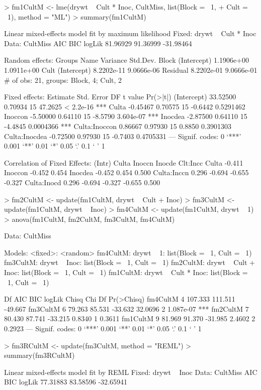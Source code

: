 \documentclass[12pt]{article}
\begin{document}
\begin{Schunk}
\begin{Sinput}
> fm1CultM <- lme(drywt ~ Cult * Inoc, CultMiss, list(Block = ~1, 
+     Cult = ~1), method = "ML")
> summary(fm1CultM)
\end{Sinput}
\begin{Soutput}
Linear mixed-effects model fit by maximum likelihood
Fixed: drywt ~ Cult * Inoc 
 Data: CultMiss 
      AIC      BIC    logLik
 81.96929 91.36999 -31.98464

Random effects:
 Groups   Name        Variance   Std.Dev.  
 Block    (Intercept) 1.1906e+00 1.0911e+00
 Cult     (Intercept) 8.2202e-11 9.0666e-06
 Residual             8.2202e-01 9.0666e-01
# of obs: 21, groups: Block, 4; Cult, 2

Fixed effects:
              Estimate Std. Error DF t value  Pr(>|t|)    
(Intercept)   33.52500    0.70934 15 47.2625 < 2.2e-16 ***
Culta         -0.45467    0.70575 15 -0.6442 0.5291462    
Inoccon       -5.50000    0.64110 15 -8.5790 3.604e-07 ***
Inocdea       -2.87500    0.64110 15 -4.4845 0.0004366 ***
Culta:Inoccon  0.86667    0.97930 15  0.8850 0.3901303    
Culta:Inocdea -0.72500    0.97930 15 -0.7403 0.4705331    
---
Signif. codes:  0 `***' 0.001 `**' 0.01 `*' 0.05 `.' 0.1 ` ' 1 

Correlation of Fixed Effects:
            (Intr) Culta  Inoccn Inocde Clt:Incc
Culta       -0.411                              
Inoccon     -0.452  0.454                       
Inocdea     -0.452  0.454  0.500                
Culta:Inccn  0.296 -0.694 -0.655 -0.327         
Culta:Inocd  0.296 -0.694 -0.327 -0.655  0.500  
\end{Soutput}
\begin{Sinput}
> fm2CultM <- update(fm1CultM, drywt ~ Cult + Inoc)
> fm3CultM <- update(fm1CultM, drywt ~ Inoc)
> fm4CultM <- update(fm1CultM, drywt ~ 1)
> anova(fm1CultM, fm2CultM, fm3CultM, fm4CultM)
\end{Sinput}
\begin{Soutput}
Data: CultMiss

Models: <fixed>: <random>
fm4CultM: drywt ~ 1: list(Block = ~1, Cult = ~1)
fm3CultM: drywt ~ Inoc: list(Block = ~1, Cult = ~1)
fm2CultM: drywt ~ Cult + Inoc: list(Block = ~1, Cult = ~1)
fm1CultM: drywt ~ Cult * Inoc: list(Block = ~1, Cult = ~1)

         Df     AIC     BIC  logLik   Chisq Chi Df Pr(>Chisq)    
fm4CultM  4 107.333 111.511 -49.667                              
fm3CultM  6  79.263  85.531 -33.632 32.0696      2  1.087e-07 ***
fm2CultM  7  80.430  87.741 -33.215  0.8340      1     0.3611    
fm1CultM  9  81.969  91.370 -31.985  2.4602      2     0.2923    
---
Signif. codes:  0 `***' 0.001 `**' 0.01 `*' 0.05 `.' 0.1 ` ' 1 
\end{Soutput}
\begin{Sinput}
> fm3RCultM <- update(fm3CultM, method = "REML")
> summary(fm3RCultM)
\end{Sinput}
\begin{Soutput}
Linear mixed-effects model fit by REML
Fixed: drywt ~ Inoc 
 Data: CultMiss 
      AIC      BIC    logLik
 77.31883 83.58596 -32.65941


\end{Soutput}
\end{Schunk}
\end{document}
